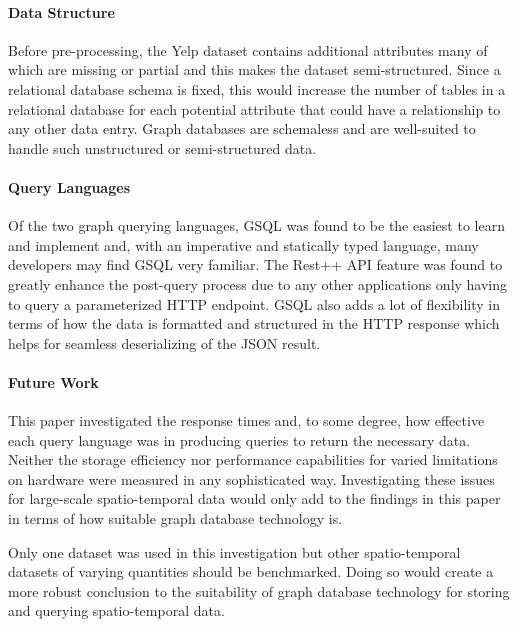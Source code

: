 \paragraph{Data Structure}

Before pre-processing, the Yelp dataset contains additional attributes many of which are missing or partial and this makes the dataset semi-structured. Since a relational database schema is fixed, this would increase the number of tables in a relational database for each potential attribute that could have a relationship to any other data entry. Graph databases are schemaless and are well-suited to handle such unstructured or semi-structured data. 

\paragraph{Query Languages}

Of the two graph querying languages, GSQL was found to be the easiest to learn and implement and, with an imperative and statically typed language, many developers may find GSQL very familiar. The Rest++ API feature was found to greatly enhance the post-query process due to any other applications only having to query a parameterized HTTP endpoint. GSQL also adds a lot of flexibility in terms of how the data is formatted and structured in the HTTP response which helps for seamless deserializing of the JSON result.

\paragraph{Future Work}

This paper investigated the response times and, to some degree, how effective each query language was in producing queries to return the necessary data. Neither the storage efficiency nor performance capabilities for varied limitations on hardware were measured in any sophisticated way. Investigating these issues for large-scale spatio-temporal data would only add to the findings in this paper in terms of how suitable graph database technology is.

Only one dataset was used in this investigation but other spatio-temporal datasets of varying quantities should be benchmarked. Doing so would create a more robust conclusion to the suitability of graph database technology for storing and querying spatio-temporal data.

